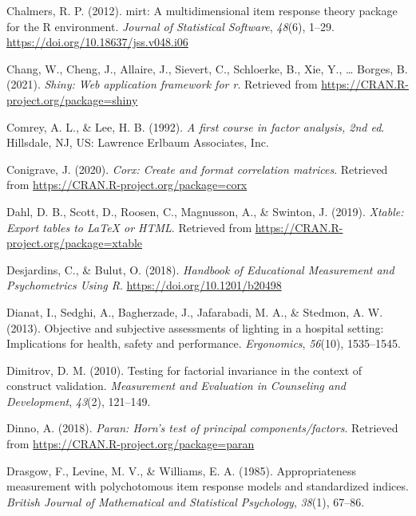 \documentclass[
  english,
  man]{apa6}
\newlength{\cslhangindent}
\newlength{\cslentryspacingunit} %
\newenvironment{CSLReferences}[2] %
 {%
  \setlength{\parindent}{0pt}
  \ifodd #1
  \let\oldpar\par
  \def\par{\hangindent=\cslhangindent\oldpar}
  \fi
  \setlength{\parskip}{#2\cslentryspacingunit}
 }%
 {}
\begin{document}
\begin{CSLReferences}{1}{0}
\leavevmode{}%
Chalmers, R. P. (2012). {mirt}: A multidimensional item response theory package for the {R} environment. \emph{Journal of Statistical Software}, \emph{48}(6), 1--29. \url{https://doi.org/10.18637/jss.v048.i06}

\leavevmode{}%
Chang, W., Cheng, J., Allaire, J., Sievert, C., Schloerke, B., Xie, Y., \ldots{} Borges, B. (2021). \emph{Shiny: Web application framework for r}. Retrieved from \url{https://CRAN.R-project.org/package=shiny}

\leavevmode{}%
Comrey, A. L., \& Lee, H. B. (1992). \emph{A first course in factor analysis, 2nd ed}. {Hillsdale, NJ, US}: {Lawrence Erlbaum Associates, Inc}.

\leavevmode{}%
Conigrave, J. (2020). \emph{Corx: Create and format correlation matrices}. Retrieved from \url{https://CRAN.R-project.org/package=corx}

\leavevmode{}%
Dahl, D. B., Scott, D., Roosen, C., Magnusson, A., \& Swinton, J. (2019). \emph{Xtable: Export tables to LaTeX or HTML}. Retrieved from \url{https://CRAN.R-project.org/package=xtable}

\leavevmode{}%
Desjardins, C., \& Bulut, O. (2018). \emph{Handbook of {Educational Measurement} and {Psychometrics Using R}}. \url{https://doi.org/10.1201/b20498}

\leavevmode{}%
Dianat, I., Sedghi, A., Bagherzade, J., Jafarabadi, M. A., \& Stedmon, A. W. (2013). Objective and subjective assessments of lighting in a hospital setting: Implications for health, safety and performance. \emph{Ergonomics}, \emph{56}(10), 1535--1545.

\leavevmode{}%
Dimitrov, D. M. (2010). Testing for factorial invariance in the context of construct validation. \emph{Measurement and Evaluation in Counseling and Development}, \emph{43}(2), 121--149.

\leavevmode{}%
Dinno, A. (2018). \emph{Paran: Horn's test of principal components/factors}. Retrieved from \url{https://CRAN.R-project.org/package=paran}

\leavevmode{}%
Drasgow, F., Levine, M. V., \& Williams, E. A. (1985). Appropriateness measurement with polychotomous item response models and standardized indices. \emph{British Journal of Mathematical and Statistical Psychology}, \emph{38}(1), 67--86.


\end{CSLReferences}
\end{document}
